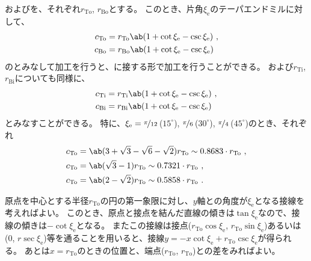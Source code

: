 \TopEndFaceOutRChamferRadius および\BottomEndFaceOutRChamferRadius を、それぞれ$r_\mathrm{To}$, $r_\mathrm{Bo}$とする。
このとき、片角$\xi_\mathrm e$のテーパエンドミルに対して、
\begin{align*}
  c_\mathrm{To} &= r_\mathrm{To}\ab(1+\cot\xi_\mathrm e-\csc\xi_\mathrm e)\ ,\\
  c_\mathrm{Bo} &= r_\mathrm{Bo}\ab(1+\cot\xi_\mathrm e-\csc\xi_\mathrm e)
\end{align*}
の\EndFaceOutCChamferLength とみなして加工を行うと、\EndFaceRChamfer に接する形で加工を行うことができる。
\TopEndFaceInRChamferRadius および\BottomFaceInRChamferRadius$r_\mathrm{Ti}$, $r_\mathrm{Bi}$についても同様に、
\begin{align*}
  c_\mathrm{Ti} &= r_\mathrm{Ti}\ab(1+\cot\xi_\mathrm e-\csc\xi_\mathrm e)\ ,\\
  c_\mathrm{Bi} &= r_\mathrm{Bi}\ab(1+\cot\xi_\mathrm e-\csc\xi_\mathrm e)
\end{align*}
とみなすことができる。
特に、$\xi_\mathrm e = \nicefrac\pi{12}$\,($15^\circ$), $\nicefrac\pi6$\,($30^\circ$), $\nicefrac\pi4$\,($45^\circ$)のとき、それぞれ
\begin{align*}
  c_\mathrm{To} &= \ab(3+\sqrt3-\sqrt6-\sqrt2)r_\mathrm{To} \sim 0.8683\cdot r_\mathrm{To}\ ,\\
  c_\mathrm{To} &= \ab(\sqrt3-1)r_\mathrm{To} \sim 0.7321\cdot r_\mathrm{To}\ ,\\
  c_\mathrm{To} &= \ab(2-\sqrt2)r_\mathrm{To} \sim 0.5858\cdot r_\mathrm{To}\ .
\end{align*}
\begin{hosoku}
原点を中心とする半径$r_\mathrm{To}$の円の第一象限に対し、$y$軸との角度が$\xi_\mathrm e$となる接線を考えればよい。
このとき、原点と接点を結んだ直線の傾きは$\tan\xi_\mathrm e$なので、接線の傾きは$-\cot\xi_\mathrm e$となる。
またこの接線は接点($r_\mathrm{To}\cos\xi_\mathrm e$, $r_\mathrm{To}\sin\xi_\mathrm e$)あるいは(0, $r\sec\xi_\mathrm e$)等を通ることを用いると、接線$y = -x\cot\xi_\mathrm e+r_\mathrm{To}\csc\xi_\mathrm e$が得られる。
あとは$x = r_\mathrm{To}$のときの位置と、端点($r_\mathrm{To}$, $r_\mathrm{To}$)との差をみればよい。
\end{hosoku}



